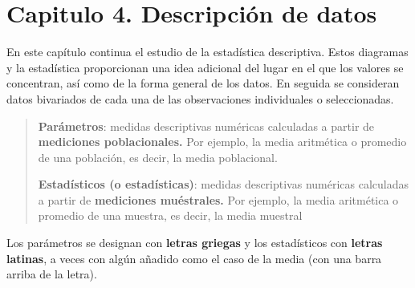 \documentclass[]{article}
\begin{document}
\section{Capitulo 4. Descripción de datos}
En este capítulo continua el estudio de la estadística descriptiva. Estos diagramas y la estadística proporcionan una idea adicional del lugar en el que los valores se concentran, así como de la forma general de los datos. En seguida se consideran datos bivariados de cada una de las observaciones individuales o seleccionadas.
\begin{quote}
	\textbf{Parámetros}: medidas descriptivas numéricas calculadas a partir de \textbf{mediciones poblacionales.} Por ejemplo, la media aritmética o promedio de una población, es decir, la media poblacional.
	\item \textbf{Estadísticos (o estadísticas)}: medidas descriptivas numéricas calculadas a partir de \textbf{mediciones muéstrales.} Por ejemplo, la media aritmética o promedio de una muestra, es decir, la media muestral
\end{quote}
Los parámetros se designan con \textbf{letras griegas} y los estadísticos con \textbf{letras latinas}, a veces con algún añadido como el caso de la media (con una barra arriba de la letra).
\end{document}
